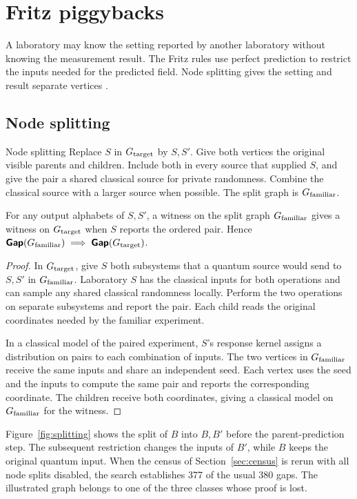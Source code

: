 \section{Fritz piggybacks}\label{sec:fritz}
A laboratory may know the setting reported by another laboratory without
knowing the measurement result. The Fritz rules use perfect prediction to
restrict the inputs needed for the predicted field. Node splitting gives
the setting and result separate vertices \cite{Fritz}.

\subsection{Node splitting}\label{sec:splitting}
\begin{piggyback}{Node splitting}
Replace \(S\) in \(G_{\text{target}}\) by \(S,S'\). Give both vertices the original
visible parents and children. Include both in every source that supplied
\(S\), and give the pair a shared classical source for private randomness.
Combine the classical source with a larger source when possible. The split
graph is \(G_{\text{familiar}}\).
\end{piggyback}
\begin{proposition}\label{prop:splitting}
For any output alphabets of \(S,S'\), a witness on the split graph
\(G_{\text{familiar}}\) gives a witness on \(G_{\text{target}}\) when \(S\) reports the ordered
pair. Hence \(\operatorname{\text{\normalfont\sffamily\bfseries Gap}}(G_{\text{familiar}})\implies\operatorname{\text{\normalfont\sffamily\bfseries Gap}}(G_{\text{target}})\).
\end{proposition}
\begin{proof}
In \(G_{\text{target}}\), give \(S\) both subsystems that a quantum source would
send to \(S,S'\) in \(G_{\text{familiar}}\). Laboratory \(S\) has the classical
inputs for both operations and can sample any shared classical randomness
locally. Perform the two operations on separate subsystems and report
the pair. Each child reads the original coordinates needed by the
familiar experiment.

In a classical model of the paired experiment, \(S\)'s response kernel
assigns a distribution on pairs to each combination of inputs. The two
vertices in \(G_{\text{familiar}}\) receive the same inputs and share an independent
seed. Each vertex uses the seed and the inputs to compute the same pair
and reports the corresponding coordinate. The children receive both
coordinates, giving a classical model on \(G_{\text{familiar}}\) for the witness.
\end{proof}
Figure~\ref{fig:splitting} shows the split of \(B\) into \(B,B'\) before
the parent-prediction step. The subsequent restriction changes the
inputs of \(B'\), while \(B\) keeps the original quantum input. When
the census of Section~\ref{sec:census} is rerun with all node splits
disabled, the search establishes 377 of the usual 380 gaps. The
illustrated graph belongs to one of the three classes whose proof is lost.

